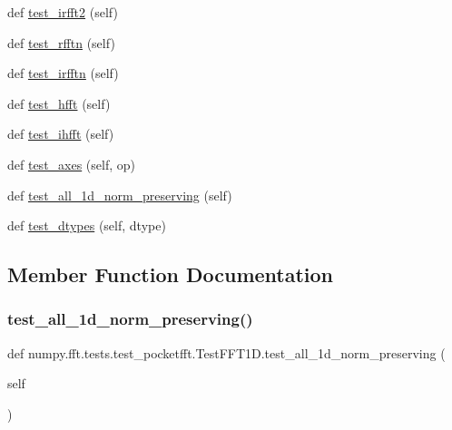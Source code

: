\begin{DoxyCompactItemize}
def \hyperlink{classnumpy_1_1fft_1_1tests_1_1test__pocketfft_1_1TestFFT1D_a37632713a69ee5687dce2d09280af6f0}{test\+\_\+irfft2} (self)
\item 
def \hyperlink{classnumpy_1_1fft_1_1tests_1_1test__pocketfft_1_1TestFFT1D_a0fb63d369f21f123dbb94333b30bb328}{test\+\_\+rfftn} (self)
\item 
def \hyperlink{classnumpy_1_1fft_1_1tests_1_1test__pocketfft_1_1TestFFT1D_a4fffbe6d4ff1f0faf1d92ebb8155ea95}{test\+\_\+irfftn} (self)
\item 
def \hyperlink{classnumpy_1_1fft_1_1tests_1_1test__pocketfft_1_1TestFFT1D_abc457523f06eeeff8ae57002d5f471fb}{test\+\_\+hfft} (self)
\item 
def \hyperlink{classnumpy_1_1fft_1_1tests_1_1test__pocketfft_1_1TestFFT1D_a306f55dc2585cef47aea19c456fb75c9}{test\+\_\+ihfft} (self)
\item 
def \hyperlink{classnumpy_1_1fft_1_1tests_1_1test__pocketfft_1_1TestFFT1D_ab806745a43e0ec565a98e003cb463e68}{test\+\_\+axes} (self, op)
\item 
def \hyperlink{classnumpy_1_1fft_1_1tests_1_1test__pocketfft_1_1TestFFT1D_ade81fe54f97d28378d45e094a857252c}{test\+\_\+all\+\_\+1d\+\_\+norm\+\_\+preserving} (self)
\item 
def \hyperlink{classnumpy_1_1fft_1_1tests_1_1test__pocketfft_1_1TestFFT1D_ac5f7bedb4ed50aa95684683572e2cfba}{test\+\_\+dtypes} (self, dtype)
\end{DoxyCompactItemize}


\subsection{Member Function Documentation}
\mbox{\label{classnumpy_1_1fft_1_1tests_1_1test__pocketfft_1_1TestFFT1D_ade81fe54f97d28378d45e094a857252c}} 
\subsubsection{\texorpdfstring{test\+\_\+all\+\_\+1d\+\_\+norm\+\_\+preserving()}{test\_all\_1d\_norm\_preserving()}}
{\footnotesize\ttfamily def numpy.\+fft.\+tests.\+test\+\_\+pocketfft.\+Test\+F\+F\+T1\+D.\+test\+\_\+all\+\_\+1d\+\_\+norm\+\_\+preserving (\begin{DoxyParamCaption}\item[{}]{self }\end{DoxyParamCaption})}

